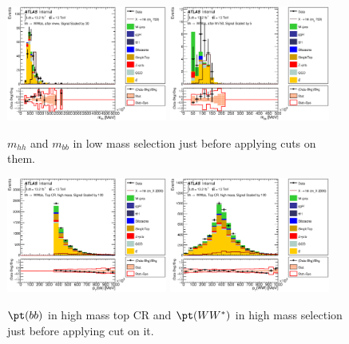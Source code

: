 \begin{figure}[!h]
\begin{center}
\includegraphics*[width=0.47\textwidth] {chapters/dihiggs/figures/ControlPlots/CR1/C_opt700_bbpt150_drbb11_drww09_mww_hhMass.eps}
\includegraphics*[width=0.47\textwidth] {chapters/dihiggs/figures/ControlPlots/CR1/C_opt700_bbpt150_drbb11_drww09_mww_hh750_bbMass.eps}
\caption[$m_{hh}$ and $m_{bb}$ in low mass selection just before applying cuts on them.]{$m_{hh}$ and $m_{bb}$ in low mass selection just before applying cuts on them. }
\end{center}
\label{fig:mhh_mbb}
\end{figure}

\begin{figure}[!h]
\begin{center}
\includegraphics*[width=0.47\textwidth] {chapters/dihiggs/figures/ControlPlots/CR2/C_opt2000_bbpt350_bbPt.eps}
\includegraphics*[width=0.47\textwidth] {chapters/dihiggs/figures/ControlPlots/CR2/C_opt2000_bbpt350_WWPt.eps}
\caption [$\pt(bb)$ in high mass top CR and $\pt(WW^{\ast})$ in high mass selection just before applying cut on it.] {$\pt(bb)$ in high mass top CR and $\pt(WW^{\ast})$ in high mass selection just before applying cut on it.  }
\end{center}
\end{figure}


